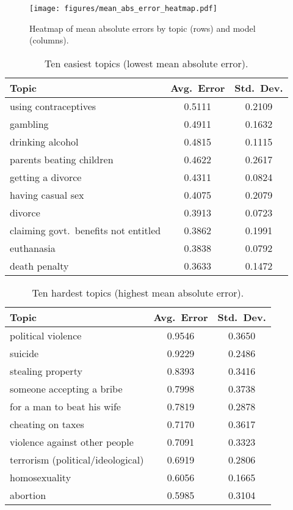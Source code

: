 \documentclass[11pt]{article}
\begin{document}
\begin{figure}[ht]
\centering
\texttt{[image: figures/mean\_abs\_error\_heatmap.pdf]}
\vspace{-15pt}
\caption{\small Heatmap of mean absolute errors by topic (rows) and model (columns).}
\label{fig:heatmap}
\end{figure}
\vspace{-15pt}
\begin{table}[ht]
\centering
\scriptsize
\renewcommand{\arraystretch}{1.0}
\caption{\small Ten easiest topics (lowest mean absolute error).}
\vspace{-5pt}
\begin{tabular}{lcc}
\toprule
\textbf{Topic} & \textbf{Avg.\ Error} & \textbf{Std.\ Dev.}\\
\midrule
using contraceptives & 0.5111 & 0.2109 \\
gambling & 0.4911 & 0.1632 \\
drinking alcohol & 0.4815 & 0.1115 \\
parents beating children & 0.4622 & 0.2617 \\
getting a divorce & 0.4311 & 0.0824 \\
having casual sex & 0.4075 & 0.2079 \\
divorce & 0.3913 & 0.0723 \\
claiming govt.\ benefits not entitled & 0.3862 & 0.1991 \\
euthanasia & 0.3838 & 0.0792 \\
death penalty & 0.3633 & 0.1472 \\
\bottomrule
\end{tabular}
\label{tab:EasiestTopics}
\end{table}
\vspace{-8pt}
\begin{table}[ht]
\centering
\scriptsize
\renewcommand{\arraystretch}{1.0}
\caption{\small Ten hardest topics (highest mean absolute error).}
\vspace{-5pt}
\begin{tabular}{lcc}
\toprule
\textbf{Topic} & \textbf{Avg.\ Error} & \textbf{Std.\ Dev.}\\
\midrule
political violence & 0.9546 & 0.3650 \\
suicide & 0.9229 & 0.2486 \\
stealing property & 0.8393 & 0.3416 \\
someone accepting a bribe & 0.7998 & 0.3738 \\
for a man to beat his wife & 0.7819 & 0.2878 \\
cheating on taxes & 0.7170 & 0.3617 \\
violence against other people & 0.7091 & 0.3323 \\
terrorism (political/ideological) & 0.6919 & 0.2806 \\
homosexuality & 0.6056 & 0.1665 \\
abortion & 0.5985 & 0.3104 \\
\bottomrule
\end{tabular}
\label{tab:HardestTopics}
\end{table}
\end{document}
